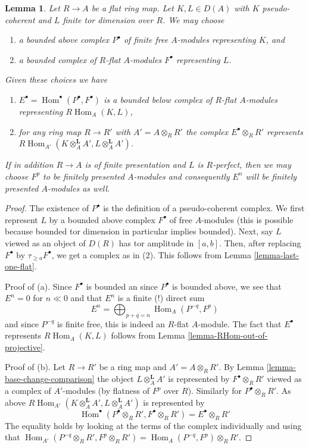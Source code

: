\documentclass[10pt,a4paper]{amsart}
\theoremstyle{plain}
\newtheorem{lemma}[subsection]{Lemma}
\theoremstyle{definition}
\theoremstyle{remark}
\numberwithin{equation}{subsection}
\def\Hom{\mathop{\mathrm{Hom}}\nolimits}
\begin{document}
\begin{lemma}
\label{lemma-compute-RHom-relatively-perfect}
Let $R \to A$ be a flat ring map. Let $K, L \in D(A)$ with $K$
pseudo-coherent and $L$ finite tor dimension over $R$. We may choose
\begin{enumerate}
\item a bounded above complex $P^\bullet$
of finite free $A$-modules representing $K$, and
\item a bounded complex of $R$-flat $A$-modules
$F^\bullet$ representing $L$.
\end{enumerate}
Given these choices we have
\begin{enumerate}
\item[(a)] $E^\bullet = \Hom^\bullet(P^\bullet, F^\bullet)$
is a bounded below complex
of $R$-flat $A$-modules representing $R\Hom_A(K, L)$,
\item[(b)] for any ring map $R \to R'$ with $A' = A \otimes_R R'$
the complex $E^\bullet \otimes_R R'$ represents
$R\Hom_{A'}(K \otimes_A^\mathbf{L} A', L \otimes_A^\mathbf{L} A')$.
\end{enumerate}
If in addition $R \to A$ is of finite presentation and $L$ is
$R$-perfect, then we may choose $F^p$ to be finitely presented
$A$-modules and consequently $E^n$ will be finitely presented $A$-modules
as well.
\end{lemma}

\begin{proof}
The existence of $P^\bullet$ is the definition of a pseudo-coherent complex.
We first represent $L$
by a bounded above complex $F^\bullet$ of free $A$-modules
(this is possible because bounded tor dimension in particular
implies bounded). Next, say $L$ viewed as an object of $D(R)$
has tor amplitude in $[a, b]$. Then, after replacing
$F^\bullet$ by $\tau_{\geq a}F^\bullet$, we get a complex
as in (2). This follows from Lemma \ref{lemma-last-one-flat}.

\medskip\noindent
Proof of (a).
Since $F^\bullet$ is bounded an since $P^\bullet$ is bounded above,
we see that $E^n = 0$ for $n \ll 0$ and that
$E^n$ is a finite (!) direct sum
$$
E^n = \bigoplus\nolimits_{p + q = n} \Hom_A(P^{-q}, F^p)
$$
and since $P^{-q}$ is finite free, this is indeed an $R$-flat $A$-module.
The fact that $E^\bullet$ represents $R\Hom_A(K, L)$
follows from Lemma \ref{lemma-RHom-out-of-projective}.

\medskip\noindent
Proof of (b).
Let $R \to R'$ be a ring map and $A' = A \otimes_R R'$.
By Lemma \ref{lemma-base-change-comparison} the object
$L \otimes_A^\mathbf{L} A'$ is represented by
$F^\bullet \otimes_R R'$ viewed as a complex of $A'$-modules
(by flatness of $F^p$ over $R$). Similarly for $P^\bullet \otimes_R R'$.
As above $R\Hom_{A'}(K \otimes_A^\mathbf{L} A', L \otimes_A^\mathbf{L} A')$
is represented by
$$
\Hom^\bullet(P^\bullet \otimes_R R', F^\bullet \otimes_R R') =
E^\bullet \otimes_R R'
$$
The equality holds by looking at the terms of the complex individually
and using that $\Hom_{A'}(P^{-q} \otimes_R R', F^p \otimes_R R') =
\Hom_A(P^{-q}, F^p) \otimes_R R'$.
\end{proof}
\end{document}
